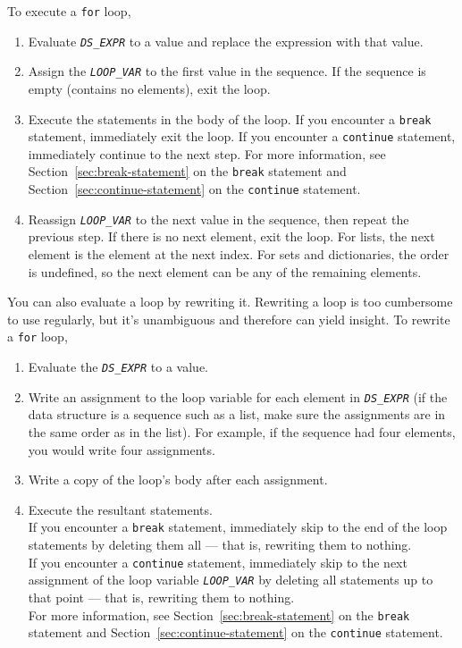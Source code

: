 \documentclass{article}
\newcommand{\expr}[1]{\texttt{#1}}
\newcommand{\kw}[1]{\expr{#1}}
\newcommand{\mvar}[1]{\expr{\emph{\uppercase{#1}}}}
\begin{document}
  To execute a \kw{for} loop,

  \begin{enumerate}
    \item
    Evaluate \mvar{DS\_EXPR} to a value and replace the expression with that value.

    \item
    Assign the \mvar{LOOP\_VAR} to the first value in the sequence. If the sequence is empty (contains no elements), exit the loop.

    \item
    Execute the statements in the body of the loop.  If you encounter a
    \kw{break} statement, immediately exit the loop.  If you encounter a
    \kw{continue} statement, immediately continue to the next step.
    For more information, see Section~\ref{sec:break-statement} on the
    \kw{break} statement and Section~\ref{sec:continue-statement} on the
    \kw{continue} statement.

    \item
    Reassign \mvar{LOOP\_VAR} to the next value in the sequence, then
    repeat the previous step.  If there is no next element, exit the
    loop.  For lists, the next element is the element at the next index.  For
    sets and dictionaries, the order is undefined, so the next element can
    be any of the remaining elements.

  \end{enumerate}

  You can also evaluate a loop by rewriting it.  Rewriting a loop is too
  cumbersome to use regularly, but it's unambiguous and therefore can yield
  insight.  To rewrite a \kw{for} loop,

  \begin{enumerate}
    \item
    Evaluate the \mvar{DS\_EXPR} to a value.

    \item
    Write an assignment to the loop variable for each element in \mvar{DS\_EXPR} (if the data structure is a sequence such as a list, make sure the assignments are in the same order as in the list). For example, if the sequence had four elements, you would write four assignments.

    \item
    Write a copy of the loop's body after each assignment.

    \item
    Execute the resultant statements. \\
    If you encounter a \kw{break}
    statement, immediately skip to the end of the loop statements by
    deleting them all --- that is, rewriting them to nothing. \\
    If you
    encounter a \kw{continue} statement, immediately skip to the next
    assignment of the loop variable \mvar{LOOP\_VAR} by deleting all
    statements up to that point --- that is, rewriting them to nothing. \\
    For more information, see Section~\ref{sec:break-statement} on the
    \kw{break} statement and Section~\ref{sec:continue-statement} on the
    \kw{continue} statement.

  \end{enumerate}
\end{document}
